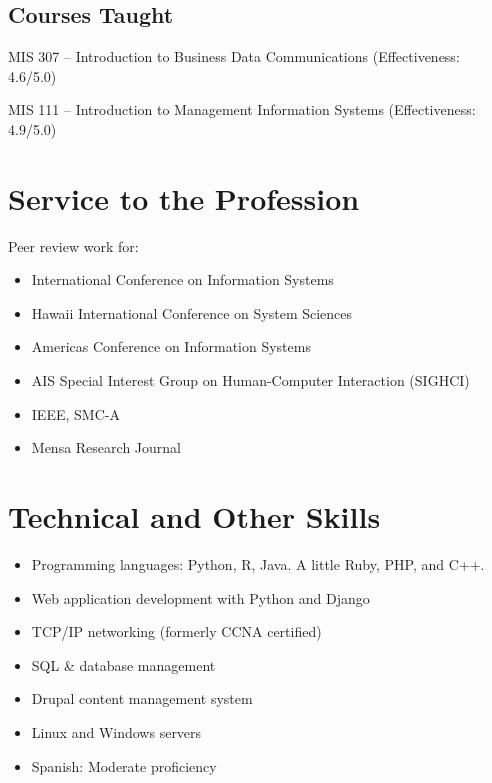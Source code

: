 \documentclass[10pt, a4paper]{article}
\newcommand{\years}[1]{\marginnote{\scriptsize #1}}
\begin{document}
\subsection*{Courses Taught}

\years{2013-2014}MIS 307 -- Introduction to Business Data Communications
(Effectiveness: 4.6/5.0)

\years{2012}MIS 111 -- Introduction to Management Information Systems
(Effectiveness: 4.9/5.0)

\section*{Service to the Profession}
Peer review work for:

\begin{itemize}
\itemsep0em
\item International Conference on Information Systems
\item Hawaii International Conference on System Sciences
\item Americas Conference on Information Systems
\item AIS Special Interest Group on Human-Computer Interaction (SIGHCI)
\item IEEE, SMC-A
\item Mensa Research Journal
\end{itemize}


\section*{Technical and Other Skills}

\begin{itemize}
\itemsep0em
\item Programming languages: Python, R, Java. A little Ruby, PHP, and C++.
\item Web application development with Python and Django
\item TCP/IP networking (formerly CCNA certified)
\item SQL \& database management
\item Drupal content management system
\item Linux and Windows servers
\item Spanish: Moderate proficiency
\end{itemize}
\end{document}
